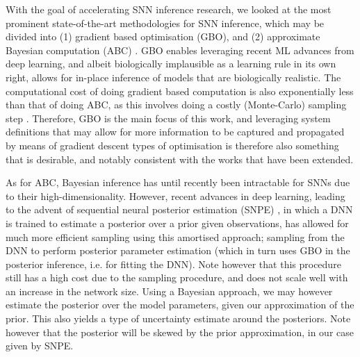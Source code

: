 \documentclass[mphil,deptreport,ianc]{infthesis} %
\begin{document}
With the goal of accelerating SNN inference research, we looked at the most prominent state-of-the-art methodologies for SNN inference, which may be divided into (1) gradient based optimisation (GBO), and (2) approximate Bayesian computation (ABC) \cite{Lueckmann2018, Rene2020, Cranmer2020a, Lueckmann2021}.
GBO enables leveraging recent ML advances from deep learning, and albeit biologically implausible as a learning rule in its own right, allows for in-place inference of models that are biologically realistic. The computational cost of doing gradient based computation is also exponentially less than that of doing ABC, as this involves doing a costly (Monte-Carlo) sampling step \cite{Rene2020}.
Therefore, GBO is the main focus of this work, and leveraging system definitions that may allow for more information to be captured and propagated by means of gradient descent types of optimisation is therefore also something that is desirable, and notably consistent with the works that have been extended.

As for ABC, Bayesian inference has until recently been intractable for SNNs due to their high-dimensionality. However, recent advances in deep learning, leading to the advent of sequential neural posterior estimation (SNPE) \cite{Greenberg2019a, Durkan2018, Goncalves2019, Cranmer2020a}, in which a DNN is trained to estimate a posterior over a prior given observations, has allowed for much more efficient sampling using this amortised approach; sampling from the DNN to perform posterior parameter estimation (which in turn uses GBO in the posterior inference, i.e. for fitting the DNN).
Note however that this procedure still has a high cost due to the sampling procedure, and does not scale well with an increase in the network size.
Using a Bayesian approach, we may however estimate the posterior over the model parameters, given our approximation of the prior. This also yields a type of uncertainty estimate around the posteriors. Note however that the posterior will be skewed by the prior approximation, in our case given by SNPE.
 
\end{document}
